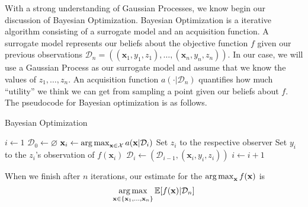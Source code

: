 With a strong understanding of Gaussian Processes, we know begin our discussion of Bayesian Optimization.
Bayesian Optimization is a iterative algorithm consisting of a surrogate model and an acquisition function.
A surrogate model represents our beliefs about the objective function $f$ given our previous observations $\mathcal{D}_n = ((\mathbf{x}_1, y_1, z_1), \ldots, (\mathbf{x}_n, y_n, z_n))$.
In our case, we will use a Gaussian Process as our surrogate model and assume that we know the values of $z_1, \ldots, z_n$.
An acquisition function $a( \cdot | \mathcal{D}_n)$
quantifies how much ``utility'' we think we can get from sampling a point given our beliefs about $f$.
The pseudocode for Bayesian optimization is as follows.

\begin{algorithm}
    \begin{algorithmic}
        \caption{Bayesian Optimization}\label{alg:bo}
        \State $i \gets 1$
        \State $\mathcal{D}_0 \gets \varnothing$
        \State $\mathbf{x}_i \gets \operatorname*{arg\,max}_{\mathbf{x} \in \mathcal{X}} a(\mathbf{x} | \mathcal{D}_i)$  
        \State Set $z_i$ to the respective observer
        \State Set $y_i$ to the $z_i$'s observation of $f(\mathbf{x}_i)$
        \State $\mathcal{D}_i \gets (\mathcal{D}_{i - 1}, (\mathbf{x}_i, y_i, z_i))$
        \State $i \gets i + 1$
        \EndWhile
    \end{algorithmic}
\end{algorithm}

When we finish after $n$ iterations, our estimate for the $\operatorname*{arg\,max}_{\mathbf{x}}f(\mathbf{x})$ is
\begin{equation*}
    \operatorname*{arg\,max}_{\mathbf{x} \in \{ \mathbf{x}_1, \ldots, \mathbf{x}_n \} } \mathbb{E}[f(\mathbf{x}) | \mathcal{D}_n]
\end{equation*}


